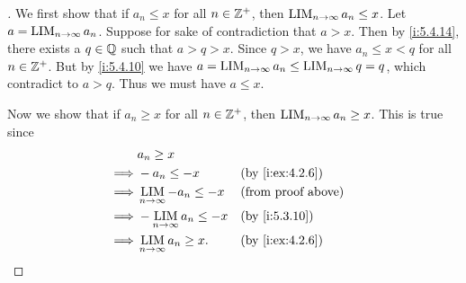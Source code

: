 \begin{proof}[]
  We first show that if \(a_n \leq x\) for all \(n \in \mathbb{Z}^+\), then \(\operatorname*{LIM}_{n \to \infty} a_n \leq x\).
  Let \(a = \operatorname*{LIM}_{n \to \infty} a_n\).
  Suppose for sake of contradiction that \(a > x\).
  Then by \cref{i:5.4.14}, there exists a \(q \in \mathbb{Q}\) such that \(a > q > x\).
  Since \(q > x\), we have \(a_n \leq x < q\) for all \(n \in \mathbb{Z}^+\).
  But by \cref{i:5.4.10} we have \(a = \operatorname*{LIM}_{n \to \infty} a_n \leq \operatorname*{LIM}_{n \to \infty} q = q\), which contradict to \(a > q\).
  Thus we must have \(a \leq x\).

  Now we show that if \(a_n \geq x\) for all \(n \in \mathbb{Z}^+\), then \(\operatorname*{LIM}_{n \to \infty} a_n \geq x\).
  This is true since
  \begin{align*}
             & a_n \geq x                                                      \\
    \implies & -a_n \leq -x                     &  & \by{i:ex:4.2.6}           \\
    \implies & \LIM_{n \to \infty} -a_n \leq -x &  & \text{(from proof above)} \\
    \implies & -\LIM_{n \to \infty} a_n \leq -x &  & \by{i:5.3.10}             \\
    \implies & \LIM_{n \to \infty} a_n \geq x.  &  & \by{i:ex:4.2.6}
  \end{align*}
\end{proof}
